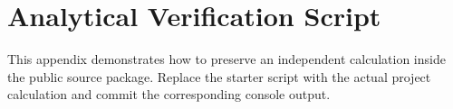 \chapter{Analytical Verification Script}
\label{app:analytical-verification}

This appendix demonstrates how to preserve an independent calculation inside the public
source package. Replace the starter script with the actual project calculation and
commit the corresponding console output.




